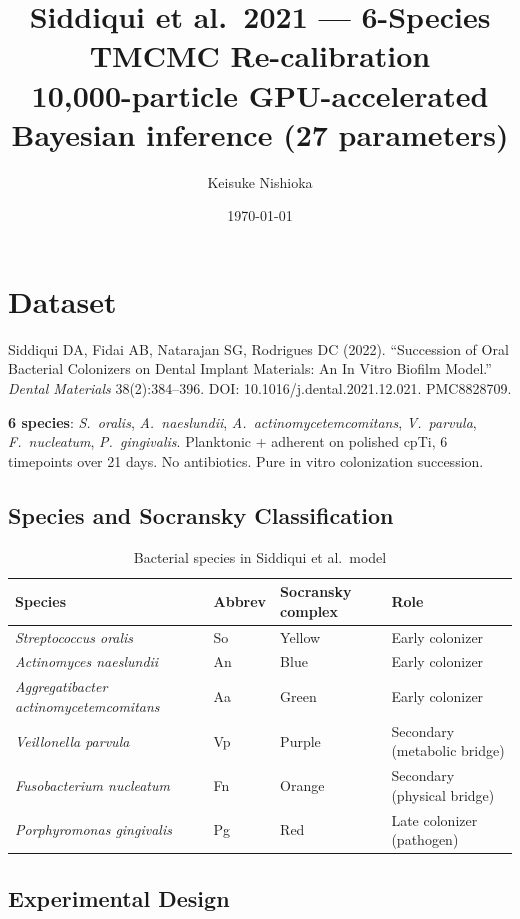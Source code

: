 \documentclass[11pt,a4paper]{article}
\title{Siddiqui et al.\ 2021 --- 6-Species TMCMC Re-calibration\\[4pt]
\large 10,000-particle GPU-accelerated Bayesian inference (27 parameters)}
\author{Keisuke Nishioka}
\date{\today}
\begin{document}
\maketitle

\section{Dataset}

Siddiqui DA, Fidai AB, Natarajan SG, Rodrigues DC (2022).
``Succession of Oral Bacterial Colonizers on Dental Implant Materials:
An In Vitro Biofilm Model.'' \textit{Dental Materials} 38(2):384--396.
DOI: 10.1016/j.dental.2021.12.021. PMC8828709.

\textbf{6 species}: \textit{S.\ oralis}, \textit{A.\ naeslundii},
\textit{A.\ actinomycetemcomitans}, \textit{V.\ parvula},
\textit{F.\ nucleatum}, \textit{P.\ gingivalis}.
Planktonic + adherent on polished cpTi, 6 timepoints over 21 days.
No antibiotics. Pure in vitro colonization succession.

\subsection{Species and Socransky Classification}

\begin{table}[H]\centering\small
\caption{Bacterial species in Siddiqui et al.\ model}
\begin{tabular}{llll}
\toprule
Species & Abbrev & Socransky complex & Role \\
\midrule
\textit{Streptococcus oralis} & So & Yellow & Early colonizer \\
\textit{Actinomyces naeslundii} & An & Blue & Early colonizer \\
\textit{Aggregatibacter actinomycetemcomitans} & Aa & Green & Early colonizer \\
\textit{Veillonella parvula} & Vp & Purple & Secondary (metabolic bridge) \\
\textit{Fusobacterium nucleatum} & Fn & Orange & Secondary (physical bridge) \\
\textit{Porphyromonas gingivalis} & Pg & Red & Late colonizer (pathogen) \\
\bottomrule
\end{tabular}
\end{table}

\subsection{Experimental Design}
\end{document}
